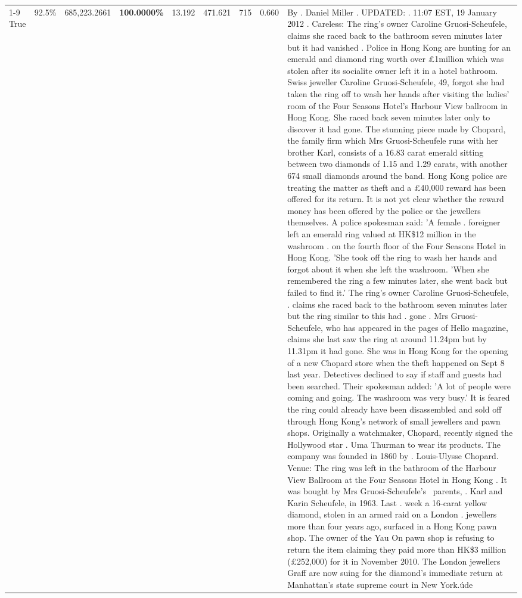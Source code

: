 \begin{table}[H]
\begin{tabular}{lllrlllll}
\cline{1-9}
True & 92.5\% & 685,223.2661 & \bfseries \color{red} 100.0000\% & 13.192 & 471.621 & 715 & 0.660 & By . Daniel Miller . UPDATED: . 11:07 EST, 19 January 2012 . Careless: The ring's owner Caroline Gruosi-Scheufele, claims she raced back to the bathroom seven minutes later but it had vanished . Police in Hong Kong are hunting for an emerald and diamond ring worth over £1million which was stolen after its socialite owner left it in a hotel bathroom. Swiss jeweller Caroline Gruosi-Scheufele, 49, forgot she had taken the ring off to wash her hands after visiting the ladies' room of the Four Seasons Hotel's Harbour View ballroom in Hong Kong. She raced back seven minutes later only to discover it had gone. The stunning piece made by Chopard, the family firm which Mrs Gruosi-Scheufele runs with her brother Karl, consists of a 16.83 carat emerald sitting between two diamonds of 1.15 and 1.29 carats, with another 674 small diamonds around the band. Hong Kong police are treating the matter as theft and a £40,000 reward has been offered for its return. It is not yet clear whether the reward money has been offered by the police or the jewellers themselves. A police spokesman said: 'A female . foreigner left an emerald ring valued at HK\$12 million in the washroom . on the fourth floor of the Four Seasons Hotel in Hong Kong. 'She took off the ring to wash her hands and forgot about it when she left the washroom. 'When she remembered the ring a few minutes later, she went back but failed to find it.' The ring's owner Caroline Gruosi-Scheufele, . claims she raced back to the bathroom seven minutes later but the ring similar to this had . gone . Mrs Gruosi-Scheufele, who has appeared in the pages of Hello magazine, claims she last saw the ring at around 11.24pm but by 11.31pm it had gone. She was in Hong Kong for the opening of a new Chopard store when the theft happened on Sept 8 last year. Detectives declined to say if staff and guests had been searched. Their spokesman added: 'A lot of people were coming and going. The washroom was very busy.' It is feared the ring could already have been disassembled and sold off through Hong Kong's network of small jewellers and pawn shops. Originally a watchmaker, Chopard, recently signed the Hollywood star . Uma Thurman to wear its products. The company was founded in 1860 by . Louis-Ulysse Chopard. Venue: The ring was left in the bathroom of the Harbour View Ballroom at the Four Seasons Hotel in Hong Kong . It was bought by Mrs Gruosi-Scheufele's  parents, . Karl and Karin Scheufele, in 1963. Last . week a 16-carat yellow diamond, stolen in an armed raid on a London . jewellers more than four years ago, surfaced in a Hong Kong pawn shop. The owner of the Yau On pawn shop is refusing to return the item claiming they paid more than HK\$3 million (£252,000) for it in November 2010. The London jewellers Graff are now suing for the diamond’s immediate return at Manhattan’s state supreme court in New York.úde \\

\end{tabular}
\end{table}
